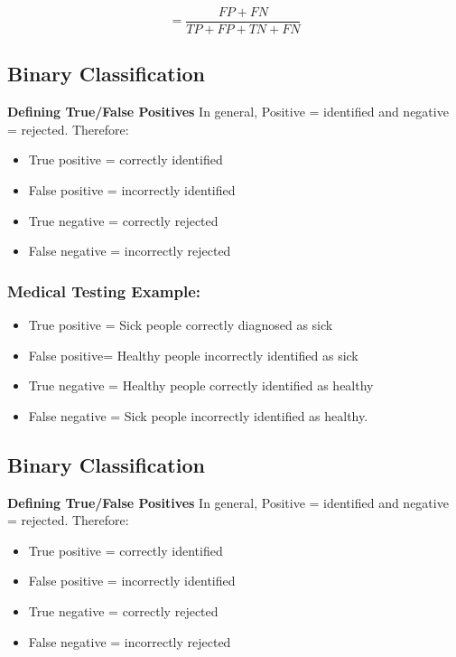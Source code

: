 \documentclass[a4paper,12pt]{article}
\begin{document}
\[ = \frac{FP + FN}{TP+FP+TN+FN}\]
\medskip




\subsection{Binary Classification}
\noindent \textbf{Defining True/False Positives}
In general, Positive = identified and negative = rejected. Therefore:

\begin{itemize}
	\item True positive = correctly identified
	
	\item False positive = incorrectly identified
	
	\item True negative = correctly rejected
	
	\item False negative = incorrectly rejected
\end{itemize}
\subsubsection*{Medical Testing Example:}
\begin{itemize}
	\item True positive = Sick people correctly diagnosed as sick
	
	\item False positive= Healthy people incorrectly identified as sick
	
	\item True negative = Healthy people correctly identified as healthy
	
	\item False negative = Sick people incorrectly identified as healthy.
\end{itemize}







\subsection{Binary Classification}
\noindent \textbf{Defining True/False Positives}
In general, Positive = identified and negative = rejected. Therefore:

\begin{itemize}
	\item True positive = correctly identified
	
	\item False positive = incorrectly identified
	
	\item True negative = correctly rejected
	
	\item False negative = incorrectly rejected
\end{itemize}
\end{document}
